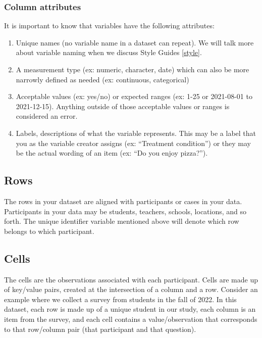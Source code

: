 \documentclass[
]{book}
\providecommand{\tightlist}{%
  \setlength{\itemsep}{0pt}\setlength{\parskip}{0pt}}
\begin{document}
\hypertarget{column-attributes}{%
\subsubsection{Column attributes}\label{column-attributes}}

It is important to know that variables have the following attributes:

\begin{enumerate}
\def\labelenumi{\arabic{enumi}.}
\tightlist
\item
  Unique names (no variable name in a dataset can repeat). We will talk more about variable naming when we discuss Style Guides \ref{style}.
\item
  A measurement type (ex: numeric, character, date) which can also be more narrowly defined as needed (ex: continuous, categorical)
\item
  Acceptable values (ex: yes/no) or expected ranges (ex: 1-25 or 2021-08-01 to 2021-12-15). Anything outside of those acceptable values or ranges is considered an error.
\item
  Labels, descriptions of what the variable represents. This may be a label that you as the variable creator assigns (ex: ``Treatment condition'') or they may be the actual wording of an item (ex: ``Do you enjoy pizza?'').
\end{enumerate}

\hypertarget{rows}{%
\subsection{Rows}\label{rows}}

The rows in your dataset are aligned with participants or cases in your data. Participants in your data may be students, teachers, schools, locations, and so forth. The unique identifier variable mentioned above will denote which row belongs to which participant.

\hypertarget{cells}{%
\subsection{Cells}\label{cells}}

The cells are the observations associated with each participant. Cells are made up of key/value pairs, created at the intersection of a column and a row. Consider an example where we collect a survey from students in the fall of 2022. In this dataset, each row is made up of a unique student in our study, each column is an item from the survey, and each cell contains a value/observation that corresponds to that row/column pair (that participant and that question).
\end{document}
